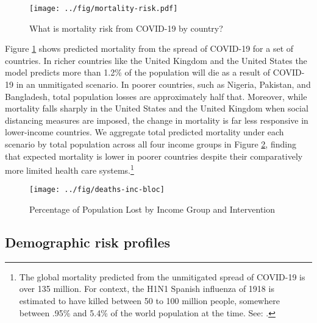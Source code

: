 \documentclass[11pt]{article}
\begin{document}
\begin{figure}[htbp!]
\centering
\caption{What is mortality risk from COVID-19 by country?}
  \texttt{[image: ../fig/mortality-risk.pdf]}
\label{fig:perc-mortality}
\end{figure}
 
Figure \ref{fig:perc-mortality} shows predicted mortality from the spread of COVID-19 for a set of countries. In richer countries like the United Kingdom and the United States the model predicts more than 1.2\% of the population will die as a result of COVID-19 in an unmitigated scenario. In poorer countries, such as Nigeria, Pakistan, and Bangladesh, total population losses are approximately half that. Moreover, while mortality falls sharply in the United States and the United Kingdom when social distancing measures are imposed, the change in mortality is far less responsive in lower-income countries. We aggregate total predicted mortality under each scenario by total population across all four income groups in Figure \ref{fig:deaths-inc-bloc}, finding that expected mortality is lower in poorer countries despite their comparatively more limited health care systems.\footnote{
    The global mortality predicted from the unmitigated spread of COVID-19 is over 135 million. For context, the H1N1 Spanish influenza of 1918 is estimated to have killed between 50 to 100 million people, somewhere between .95\% and 5.4\% of the world population at the time. See: \textcite{johnson2002,taubenberger2006}.}


\begin{figure}
\centering
\caption{Percentage of Population Lost by Income Group and Intervention}
\texttt{[image: ../fig/deaths-inc-bloc]}
\label{fig:deaths-inc-bloc}
\end{figure}

\subsection{Demographic risk profiles}
\end{document}
